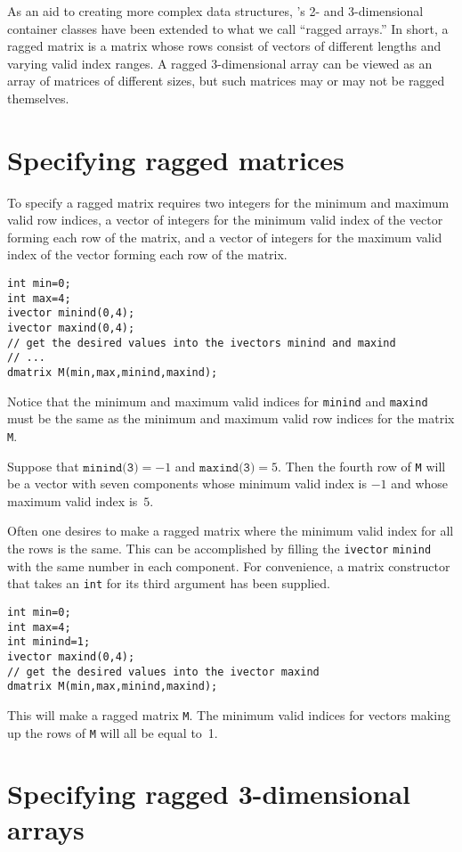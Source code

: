 \documentclass{admbmanual}
\begin{document}
As an aid to creating more complex data structures, \scAD's
2- and 3-dimensional
container classes have been extended to what we call
``ragged arrays.''  In short, a ragged matrix is a matrix whose
rows consist of vectors of different lengths and varying
valid index ranges.  A ragged 3-dimensional array
can be viewed as an array of matrices of different sizes, 
but such matrices may or may not be
ragged themselves.


\section{Specifying ragged matrices}

To specify a ragged matrix requires two integers for the minimum
and maximum valid row indices, a vector of integers for the minimum
valid index of the vector forming each row of the matrix,
and a vector of integers for the maximum
valid index of the vector forming each row of the matrix. 
\begin{lstlisting}
int min=0;
int max=4;
ivector minind(0,4);
ivector maxind(0,4);  
// get the desired values into the ivectors minind and maxind
// ...
dmatrix M(min,max,minind,maxind);
\end{lstlisting}

Notice that the minimum and maximum valid indices for \texttt{minind}
and \texttt{maxind} must be the same as the minimum and maximum
valid row indices for the matrix \texttt{M}.

Suppose that $\texttt{minind(3)}=-1$ and $\texttt{maxind(3)}=5$. Then the 
fourth row of \texttt{M} will be a vector with seven components
whose minimum valid index is $-1$ and whose maximum valid index
is~$5$.

Often one desires to make a ragged matrix where the minimum valid index
for all the rows is the same. This can be accomplished by filling
the \texttt{ivector} \texttt{minind} with the same number in each component.
For convenience, a matrix constructor that takes an \texttt{int}
for its third argument has been supplied. 
\begin{lstlisting}
int min=0;
int max=4;
int minind=1;
ivector maxind(0,4);  
// get the desired values into the ivector maxind
dmatrix M(min,max,minind,maxind);
\end{lstlisting}
This will make a ragged matrix \texttt{M}. The minimum
valid indices for vectors making up the rows of \texttt{M}
will all be equal to~1.


\section{Specifying ragged 3-dimensional arrays}
\end{document}
